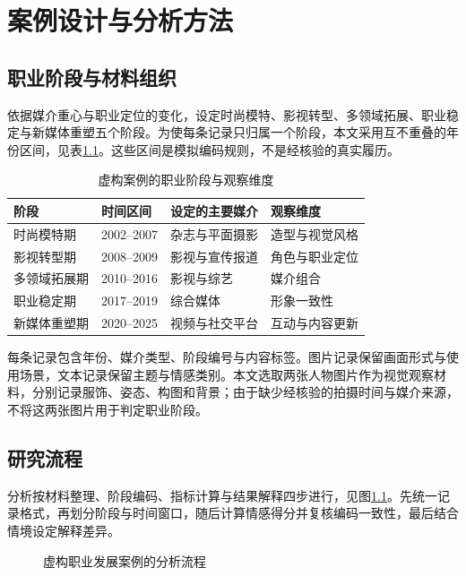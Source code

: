 \chapter{案例设计与分析方法}
\section{职业阶段与材料组织}
依据媒介重心与职业定位的变化，设定时尚模特、影视转型、多领域拓展、职业稳定与新媒体重塑五个阶段。为使每条记录只归属一个阶段，本文采用互不重叠的年份区间，见表\ref{tab:career-stages}。这些区间是模拟编码规则，不是经核验的真实履历。

\begin{table}[htbp]
  \centering
  \caption{虚构案例的职业阶段与观察维度}
  \label{tab:career-stages}
  \small
  \begin{tabular}{llll}
    \toprule
    阶段 & 时间区间 & 设定的主要媒介 & 观察维度 \\
    \midrule
    时尚模特期 & 2002--2007 & 杂志与平面摄影 & 造型与视觉风格 \\
    影视转型期 & 2008--2009 & 影视与宣传报道 & 角色与职业定位 \\
    多领域拓展期 & 2010--2016 & 影视与综艺 & 媒介组合 \\
    职业稳定期 & 2017--2019 & 综合媒体 & 形象一致性 \\
    新媒体重塑期 & 2020--2025 & 视频与社交平台 & 互动与内容更新 \\
    \bottomrule
  \end{tabular}
\end{table}

每条记录包含年份、媒介类型、阶段编号与内容标签。图片记录保留画面形式与使用场景，文本记录保留主题与情感类别。本文选取两张人物图片作为视觉观察材料，分别记录服饰、姿态、构图和背景；由于缺少经核验的拍摄时间与媒介来源，不将这两张图片用于判定职业阶段。

\section{研究流程}
分析按材料整理、阶段编码、指标计算与结果解释四步进行，见图\ref{fig:workflow}。先统一记录格式，再划分阶段与时间窗口，随后计算情感得分并复核编码一致性，最后结合情境设定解释差异。
\begin{figure}[htbp]
  \centering
  \caption{虚构职业发展案例的分析流程}
  \label{fig:workflow}
\end{figure}

